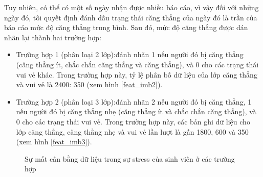Tuy nhiên, có thể có một số ngày nhận được nhiều báo cáo, vì vậy đối với những ngày đó, tôi quyết định đánh dấu trạng thái căng thẳng của ngày đó là trần của báo cáo mức độ căng thẳng trung bình. Sau đó, mức độ căng thẳng được dán nhãn lại thành hai trường hợp:
\begin{itemize}
    \item Trường hợp 1 (phân loại 2 lớp):đánh nhãn 1 nếu người đó bị căng thẳng (căng thẳng ít, chắc chắn căng thẳng và căng thẳng), và 0 cho các trạng thái vui vẻ khác. Trong trường hợp này, tỷ lệ phân bố dữ liệu của lớp căng thẳng và vui vẻ là 2400: 350 (xem hình \ref{feat_imb2}).
    \item Trường hợp 2 (phân loại 3 lớp):đánh nhãn 2 nếu người đó bị căng thẳng, 1 nếu người đó bị căng thẳng nhẹ (căng thẳng ít và chắc chắn căng thẳng), và 0 cho các trạng thái vui vẻ. Trong trường hợp này, các bản ghi dữ liệu cho lớp căng thẳng, căng thẳng nhẹ và vui vẻ lần lượt là gần 1800, 600 và 350 (xem hình \ref{feat_imb3}).
\end{itemize}

\begin{figure}[ht]
\caption{Sự mất cân bằng dữ liệu trong sự stress của sinh viên ở các trường hợp}
\label{feat_imb}
\end{figure}


